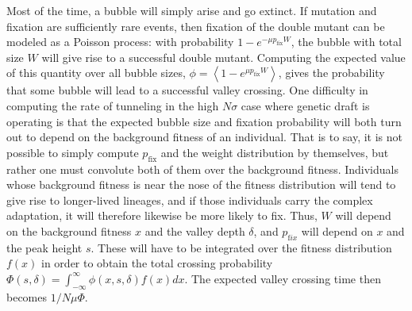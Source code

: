 \documentclass[rmp]{revtex4}
\newcommand{\pfix}{p_{\mathrm{fix}}}
\begin{document}
\begin{spacing}{1.5}
Most of the time, a bubble will simply arise and go extinct.
If mutation and fixation are sufficiently rare events, then fixation of the double mutant can be modeled as a Poisson process: with probability $1-e^{-\mu \pfix W}$, the bubble with total size $W$ will give rise to a successful double mutant.
Computing the expected value of this quantity over all bubble sizes, $\phi = \left< 1-e^{\mu \pfix W} \right>$, gives the probability that some bubble will lead to a successful valley crossing.
One difficulty in computing the rate of tunneling in the high $N\sigma$ case where genetic draft is operating is that the expected bubble size and fixation probability will both turn out to depend on the background fitness of an individual.
That is to say, it is not possible to simply compute $\pfix$ and the weight distribution by themselves, but rather one must convolute both of them over the background fitness.
Individuals whose background fitness is near the nose of the fitness distribution will tend to give rise to longer-lived lineages, and if those individuals carry the complex adaptation, it will therefore likewise be more likely to fix.
Thus, $W$ will depend on the background fitness $x$ and the valley depth $\delta$, and $p_{\mathrm fix}$ will depend on $x$ and the peak height $s$.
These will have to be integrated over the fitness distribution $f(x)$ in order to obtain the total crossing probability $\Phi(s,\delta) = \int_{-\infty}^\infty \phi(x,s,\delta) f(x) dx$.
The expected valley crossing time then becomes $1/N\mu\Phi$.


\end{spacing}
\end{document}
